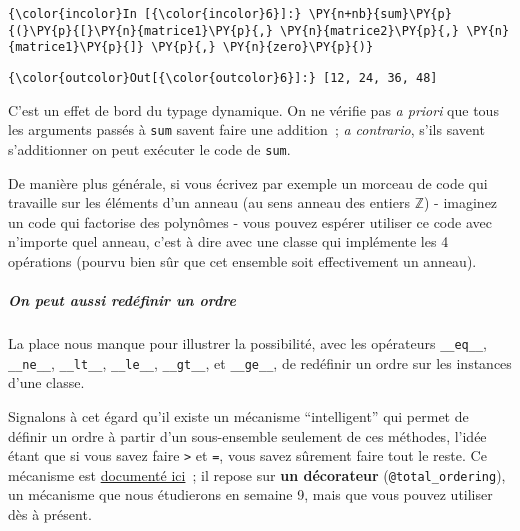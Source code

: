     \begin{Verbatim}[commandchars=\\\{\},frame=single,framerule=0.3mm,rulecolor=\color{cellframecolor}]
{\color{incolor}In [{\color{incolor}6}]:} \PY{n+nb}{sum}\PY{p}{(}\PY{p}{[}\PY{n}{matrice1}\PY{p}{,} \PY{n}{matrice2}\PY{p}{,} \PY{n}{matrice1}\PY{p}{]} \PY{p}{,} \PY{n}{zero}\PY{p}{)}
\end{Verbatim}


\begin{Verbatim}[commandchars=\\\{\},frame=single,framerule=0.3mm,rulecolor=\color{cellframecolor}]
{\color{outcolor}Out[{\color{outcolor}6}]:} [12, 24, 36, 48]
\end{Verbatim}
            
    C'est un effet de bord du typage dynamique. On ne vérifie pas \emph{a
priori} que tous les arguments passés à \texttt{sum} savent faire une
addition~; \emph{a contrario}, s'ils savent s'additionner on peut
exécuter le code de \texttt{sum}.

De manière plus générale, si vous écrivez par exemple un morceau de code
qui travaille sur les éléments d'un anneau (au sens anneau des entiers
\(\mathbb{Z}\)) - imaginez un code qui factorise des polynômes - vous
pouvez espérer utiliser ce code avec n'importe quel anneau, c'est à dire
avec une classe qui implémente les 4 opérations (pourvu bien sûr que cet
ensemble soit effectivement un anneau).

    \hypertarget{on-peut-aussi-reduxe9finir-un-ordre}{%
\subparagraph{On peut aussi redéfinir un
ordre}\label{on-peut-aussi-reduxe9finir-un-ordre}}

    La place nous manque pour illustrer la possibilité, avec les opérateurs
\texttt{\_\_eq\_\_}, \texttt{\_\_ne\_\_}, \texttt{\_\_lt\_\_},
\texttt{\_\_le\_\_}, \texttt{\_\_gt\_\_}, et \texttt{\_\_ge\_\_}, de
redéfinir un ordre sur les instances d'une classe.

Signalons à cet égard qu'il existe un mécanisme ``intelligent'' qui
permet de définir un ordre à partir d'un sous-ensemble seulement de ces
méthodes, l'idée étant que si vous savez faire \texttt{\textgreater{}}
et \texttt{=}, vous savez sûrement faire tout le reste. Ce mécanisme est
\href{https://docs.python.org/3/library/functools.html\#functools.total_ordering}{documenté
ici}~; il repose sur \textbf{un décorateur} (\texttt{@total\_ordering}),
un mécanisme que nous étudierons en semaine 9, mais que vous pouvez
utiliser dès à présent.

